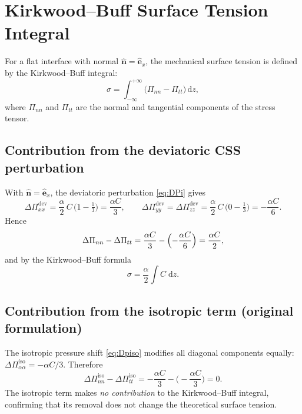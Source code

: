 \documentclass[11pt,a4paper]{article}
\newcommand{\vect}[1]{\bm{#1}}
\newcommand{\hatx}{\hat{\vect{e}}_x}
\begin{document}
\section{Kirkwood--Buff Surface Tension Integral}
\label{sec:KB}

For a flat interface with normal $\hat{\vect{n}}=\hatx$, the mechanical
surface tension is defined by the Kirkwood--Buff integral:
\begin{equation}
  \sigma = \int_{-\infty}^{+\infty}\!\!
  \bigl(\Pi_{nn} - \Pi_{tt}\bigr)\,\mathrm{d}z,
  \label{eq:KB}
\end{equation}
where $\Pi_{nn}$ and $\Pi_{tt}$ are the normal and tangential
components of the stress tensor.

\subsection{Contribution from the deviatoric CSS perturbation}

With $\hat{\vect{n}}=\hatx$, the deviatoric perturbation \eqref{eq:DPi}
gives
\begin{equation}
  \Delta\Pi_{xx}^{\text{dev}} = \frac{\alpha}{2}\,C\,
  \bigl(1 - \tfrac{1}{3}\bigr) = \frac{\alpha C}{3}, \qquad
  \Delta\Pi_{yy}^{\text{dev}} = \Delta\Pi_{zz}^{\text{dev}} =
  \frac{\alpha}{2}\,C\,\bigl(0-\tfrac{1}{3}\bigr)
  = -\frac{\alpha C}{6}.
\end{equation}
Hence
\begin{equation}
  \Delta\Pi_{nn} - \Delta\Pi_{tt}
  = \frac{\alpha C}{3} - \Bigl(-\frac{\alpha C}{6}\Bigr)
  = \frac{\alpha C}{2},
\end{equation}
and by the Kirkwood--Buff formula
\begin{equation}
  \sigma = \frac{\alpha}{2}\int C\;\mathrm{d}z .
  \label{eq:sigmaCSS}
\end{equation}

\subsection{Contribution from the isotropic term (original formulation)}

The isotropic pressure shift \eqref{eq:Dpiso} modifies all diagonal
components equally: $\Delta\Pi_{\alpha\alpha}^{\text{iso}} = -\alpha
C/3$.  Therefore
\begin{equation}
  \Delta\Pi_{nn}^{\text{iso}} - \Delta\Pi_{tt}^{\text{iso}}
  = -\frac{\alpha C}{3} - \bigl(-\frac{\alpha C}{3}\bigr) = 0.
\end{equation}
The isotropic term makes \emph{no contribution} to the Kirkwood--Buff
integral, confirming that its removal does not change the theoretical
surface tension.
\end{document}
